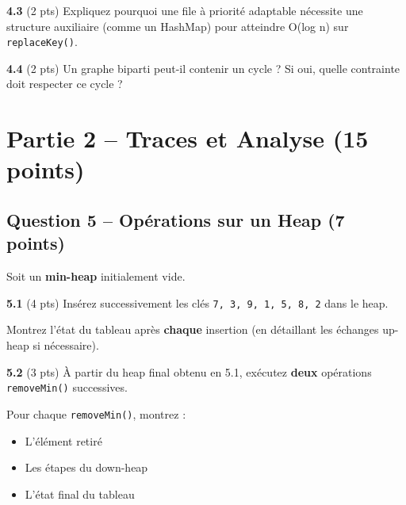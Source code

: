 \documentclass[11pt,letterpaper]{article}
\begin{document}
\textbf{4.3} (2 pts) Expliquez pourquoi une file à priorité adaptable nécessite une structure auxiliaire (comme un HashMap) pour atteindre O(log n) sur \texttt{replaceKey()}.

\vspace{5cm}

\textbf{4.4} (2 pts) Un graphe biparti peut-il contenir un cycle ? Si oui, quelle contrainte doit respecter ce cycle ?

\vspace{4cm}

\newpage

\section*{Partie 2 -- Traces et Analyse (15 points)}

\subsection*{Question 5 -- Opérations sur un Heap (7 points)}

Soit un \textbf{min-heap} initialement vide.

\textbf{5.1} (4 pts) Insérez successivement les clés \texttt{7, 3, 9, 1, 5, 8, 2} dans le heap.

Montrez l'état du tableau après \textbf{chaque} insertion (en détaillant les échanges up-heap si nécessaire).

\vspace{10cm}

\textbf{5.2} (3 pts) À partir du heap final obtenu en 5.1, exécutez \textbf{deux} opérations \texttt{removeMin()} successives.

Pour chaque \texttt{removeMin()}, montrez :
\begin{itemize}
    \item L'élément retiré
    \item Les étapes du down-heap
    \item L'état final du tableau
\end{itemize}

\vspace{8cm}
\end{document}
